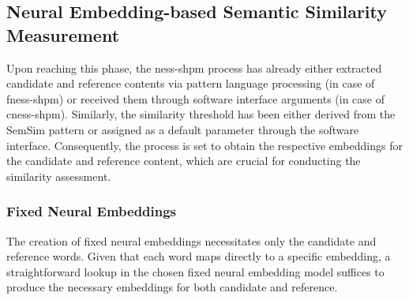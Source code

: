 \documentclass[11pt]{scrreprt}
\begin{document}
%
%


\subsection{Neural Embedding-based Semantic Similarity Measurement}
\label{sec:neural-embedding-based-semantic-similarity-measurement}
Upon reaching this phase, the \gls{ness-shpm} process has already either extracted candidate and reference contents via pattern language processing (in case of \gls{fness-shpm}) or received them through software interface arguments (in case of \gls{cness-shpm}). Similarly, the similarity threshold has been either derived from the SemSim pattern or assigned as a default parameter through the software interface. Consequently, the process is set to obtain the respective embeddings for the candidate and reference content, which are crucial for conducting the similarity assessment.



\subsubsection{Fixed Neural Embeddings}
The creation of fixed neural embeddings necessitates only the candidate and reference words. Given that each word maps directly to a specific embedding, a straightforward lookup in the chosen fixed neural embedding model suffices to produce the necessary embeddings for both candidate and reference.
\end{document}
